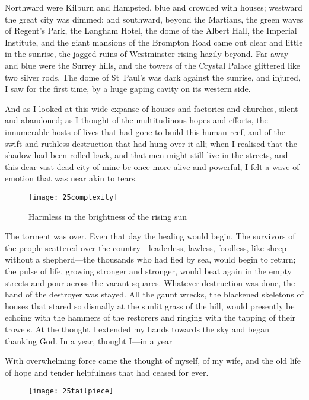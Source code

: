 Northward were Kilburn and Hampsted, blue and crowded with houses; westward the great city was dimmed; and southward, beyond the Martians, the green waves of Regent's Park, the Langham Hotel, the dome of the Albert Hall, the Imperial Institute, and the giant mansions of the Brompton Road came out clear and little in the sunrise, the jagged ruins of Westminster rising hazily beyond. Far away and blue were the Surrey hills, and the towers of the Crystal Palace glittered like two silver rods. The dome of St~Paul's was dark against the sunrise, and injured, I saw for the first time, by a huge gaping cavity on its western side.

And as I looked at this wide expanse of houses and factories and churches, silent and abandoned; as I thought of the multitudinous hopes and efforts, the innumerable hosts of lives that had gone to build this human reef, and of the swift and ruthless destruction that had hung over it all; when I realised that the shadow had been rolled back, and that men might still live in the streets, and this dear vast dead city of mine be once more alive and powerful, I felt a wave of emotion that was near akin to tears.

\begin{figure}[tbp]
\centering
\texttt{[image: 25complexity]}
\caption{Harmless in the brightness of the rising sun}
\end{figure}

The torment was over. Even that day the healing would begin. The survivors of the people scattered over the country—leaderless, lawless, foodless, like sheep without a shepherd—the thousands who had fled by sea, would begin to return; the pulse of life, growing stronger and stronger, would beat again in the empty streets and pour across the vacant squares. Whatever destruction was done, the hand of the destroyer was stayed. All the gaunt wrecks, the blackened skeletons of houses that stared so dismally at the sunlit grass of the hill, would presently be echoing with the hammers of the restorers and ringing with the tapping of their trowels. At the thought I extended my hands towards the sky and began thanking God. In a year, thought I—in a year\textellipsis

With overwhelming force came the thought of myself, of my wife, and the old life of hope and tender helpfulness that had ceased for ever.

\begin{figure}[b!]
\centering
\texttt{[image: 25tailpiece]}
\end{figure}